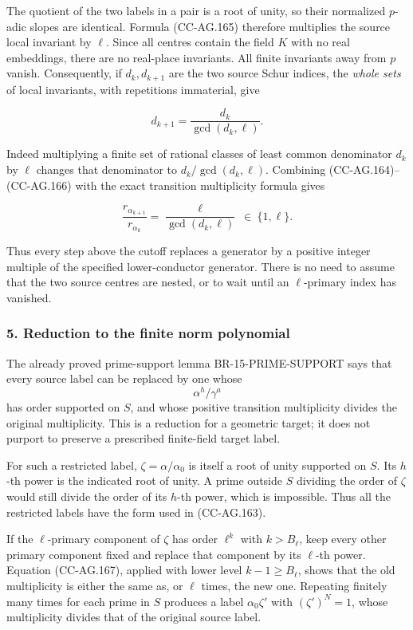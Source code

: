 The quotient of the two labels in a pair is a root of unity, so their
normalized \(p\)-adic slopes are identical. Formula (CC-AG.165)
therefore multiplies the source local invariant by \(\ell\). Since all
centres contain the field \(K\) with no real embeddings, there are no
real-place invariants. All finite invariants away from \(p\) vanish.
Consequently, if \(d_k,d_{k+1}\) are the two source Schur indices, the
\emph{whole sets} of local invariants, with repetitions immaterial, give

\[
                  d_{k+1}=\frac{d_k}{\gcd(d_k,\ell)}.
 \tag{CC-AG.166}
\]

Indeed multiplying a finite set of rational classes of least common
denominator \(d_k\) by \(\ell\) changes that denominator to
\(d_k/\gcd(d_k,\ell)\). Combining (CC-AG.164)--(CC-AG.166) with the
exact transition multiplicity formula gives

\[
 \frac{r_{\alpha_{k+1}}}{r_{\alpha_k}}
                =\frac{\ell}{\gcd(d_k,\ell)}
                    \ \in\ \{1,\ell\}.
 \tag{CC-AG.167}
\]

Thus every step above the cutoff replaces a generator by a positive
integer multiple of the specified lower-conductor generator. There is no
need to assume that the two source centres are nested, or to wait until
an \(\ell\)-primary index has vanished.

\subsubsection{5. Reduction to the finite norm
polynomial}\label{reduction-to-the-finite-norm-polynomial}

The already proved prime-support lemma BR-15-PRIME-SUPPORT says that
every source label can be replaced by one whose \[
                         \alpha^h/\gamma^a
\] has order supported on \(S\), and whose positive transition
multiplicity divides the original multiplicity. This is a reduction for
a geometric target; it does not purport to preserve a prescribed
finite-field target label.

For such a restricted label, \(\zeta=\alpha/\alpha_0\) is itself a root
of unity supported on \(S\). Its \(h\)-th power is the indicated root of
unity. A prime outside \(S\) dividing the order of \(\zeta\) would still
divide the order of its \(h\)-th power, which is impossible. Thus all
the restricted labels have the form used in (CC-AG.163).

If the \(\ell\)-primary component of \(\zeta\) has order \(\ell^k\) with
\(k>B_\ell\), keep every other primary component fixed and replace that
component by its \(\ell\)-th power. Equation (CC-AG.167), applied with
lower level \(k-1\ge B_\ell\), shows that the old multiplicity is either
the same as, or \(\ell\) times, the new one. Repeating finitely many
times for each prime in \(S\) produces a label \(\alpha_0\zeta'\) with
\((\zeta')^N=1\), whose multiplicity divides that of the original source
label.

